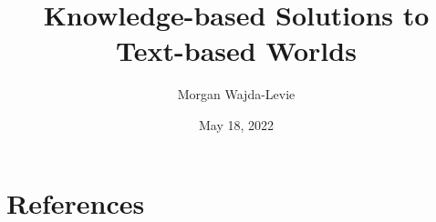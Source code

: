 \documentclass{article}
\title{Knowledge-based Solutions to Text-based Worlds}
\author{Morgan Wajda-Levie}
\date{May 18, 2022}
\begin{document}
\maketitle



















\newpage
\section*{References}
\printbibliography
\end{document}
